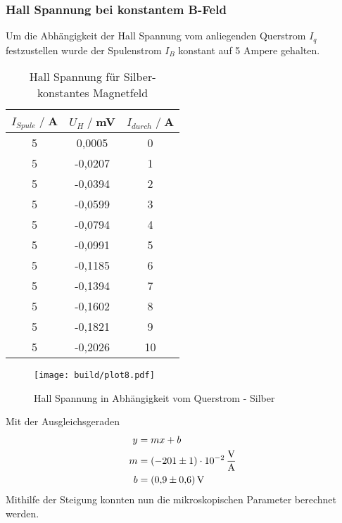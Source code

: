 \subsubsection{Hall Spannung bei konstantem B-Feld}
Um die Abhängigkeit der Hall Spannung vom anliegenden Querstrom $I_q$ festzustellen wurde der Spulenstrom $I_B$ konstant auf 5 Ampere gehalten.
\begin{table}[H]
    \centering
    \begin{tabular}{c c c}
        \toprule
        $I_{Spule} \;/\;$A & $U_H\;/\;$mV & $I_{durch} \;/\;$A\\
        \midrule
  5                   &0,0005&              0\\
  5                   &-0,0207&             1\\
  5                   &-0,0394&             2\\
  5                   &-0,0599&             3\\
  5                   &-0,0794&             4\\
  5                   &-0,0991&             5\\
  5                   &-0,1185&             6\\
  5                   &-0,1394&             7\\
  5                   &-0,1602&             8\\
  5                   &-0,1821&             9\\
  5                   &-0,2026&             10\\

       \bottomrule
    \end{tabular}
    \caption{Hall Spannung für Silber- konstantes Magnetfeld}
    \label{tab:Ag_I}
\end{table}
\begin{figure}[H]
    \centering
    \texttt{[image: build/plot8.pdf]}
    \caption{Hall Spannung in Abhängigkeit vom Querstrom - Silber}
    \label{fig:Ag_I}
\end{figure}
Mit der Ausgleichsgeraden
\begin{align*}
    y &= mx + b\\
    m &= \SI{-201 \pm 1 e-02}{\volt \per \ampere} \\
    b &= \SI{0,9 \pm 0,6}{\volt}\\
\end{align*}
Mithilfe der Steigung konnten nun die mikroskopischen Parameter berechnet werden.

